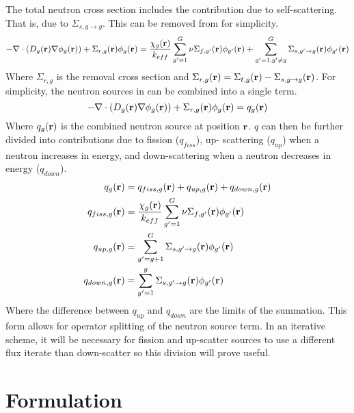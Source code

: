   The total neutron cross section includes the contribution due to 
  self-scattering. That is, due to $\Sigma_{s,g\rightarrow g}$. This can be 
  removed from  for simplicity.
  \begin{equation} \label{eq:multigroup_removal}
    - \mathbf{\nabla} \cdot( D_g(\mathbf{r}) \mathbf{\nabla} \phi_g(\mathbf{r})) + \Sigma_{r,g}(\mathbf{r}) \phi_g(\mathbf{r}) = 
      \frac{\chi_g(\mathbf{r})}{k_{eff}} \sum_{g'=1}^{G} \nu\Sigma_{f,g'}(\mathbf{r}) 
      \phi_{g'}(\mathbf{r}) + \sum_{g'=1, g' \ne g}^{G} \Sigma_{s,g' \rightarrow g}(\mathbf{r}) 
      \phi_{g'}(\mathbf{r})
  \end{equation}
  Where $\Sigma_{r,g}$ is the removal cross section and $\Sigma_{r,g}(\mathbf{r}) = 
  \Sigma_{t,g}(\mathbf{r}) - \Sigma_{s,g\rightarrow g}(\mathbf{r})$. For simplicity, the
  neutron sources in  can be  combined into a
  single term.
  \begin{equation} \label{eq:multigroup_source}
    - \mathbf{\nabla} \cdot( D_g(\mathbf{r}) \mathbf{\nabla} \phi_g(\mathbf{r})) + \Sigma_{r,g}(\mathbf{r}) \phi_g(\mathbf{r}) = 
      q_g(\mathbf{r})
  \end{equation}
  Where $q_g(\mathbf{r})$ is the combined neutron source at position $\mathbf{r}$. $q$ can 
  then be further divided into contributions due to fission ($q_{fiss}$), up-
  scattering ($q_{up}$) when a neutron increases in energy, and down-scattering 
  when a neutron decreases in energy ($q_{down}$).
  \begin{align}
    q_g(\mathbf{r}) &= q_{fiss,g}(\mathbf{r}) + q_{up,g}(\mathbf{r}) + q_{down,g}(\mathbf{r}) \\
    q_{fiss,g}(\mathbf{r}) &= \frac{\chi_g(\mathbf{r})}{k_{eff}} \sum_{g'=1}^{G} 
      \nu \Sigma_{f,g'}(\mathbf{r}) \phi_{g'}(\mathbf{r}) \\
    q_{up,g}(\mathbf{r}) &= \sum_{g'=g+1}^{G} \Sigma_{s,g' \rightarrow g}(\mathbf{r})
      \phi_{g'}(\mathbf{r}) \\
    q_{down,g}(\mathbf{r}) &= \sum_{g'=1}^{g} \Sigma_{s,g' \rightarrow g}(\mathbf{r})
      \phi_{g'}(\mathbf{r})
  \end{align}
  Where the difference between $q_{up}$ and $q_{down}$ are the limits of the 
  summation. This form allows for operator splitting of the neutron source term.
  In an iterative scheme, it will be necessary for fission and up-scatter 
  sources to use a different flux iterate than down-scatter so this division
  will prove useful.
  

\section{Formulation}

